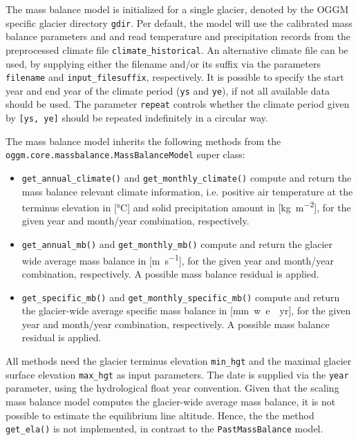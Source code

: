             The mass balance model is initialized for a single glacier, denoted by the OGGM specific glacier directory \lstinline`gdir`. Per default, the model will use the calibrated mass balance parameters \mustar{} and \bias{} and read temperature and precipitation records from the preprocessed climate file \lstinline`climate_historical`. An alternative climate file can be used, by supplying either the filename and/or its suffix via the parameters \lstinline`filename` and \lstinline`input_filesuffix`, respectively. It is possible to specify the start year and end year of the climate period (\lstinline`ys` and \lstinline`ye`), if not all available data should be used. The parameter \lstinline`repeat` controls whether the climate period given by \lstinline`[ys, ye]` should be repeated indefinitely in a circular way.

            The \vas{} mass balance model inherits the following methods from the \lstinline`oggm.core.massbalance.MassBalanceModel` super class:
            \begin{itemize}
                \item \lstinline`get_annual_climate()` and \lstinline`get_monthly_climate()` compute and return the mass balance relevant climate information, i.e. positive air temperature at the terminus elevation in [\si{\celsius}] and solid precipitation amount in [\si{\kg\per\square\m}], for the given year and month/year combination, respectively.
                \item \lstinline`get_annual_mb()` and \lstinline`get_monthly_mb()` compute and return the glacier wide average mass balance in [\si{\m\per\s}], for the given year and month/year combination, respectively. A possible mass balance residual \bias{} is applied.
                \item \lstinline`get_specific_mb()` and \lstinline`get_monthly_specific_mb()` compute and return the glacier-wide average specific mass balance in [\si{mm w.e.\per yr}], for the given year and month/year combination, respectively. A possible mass balance residual \bias{} is applied.
            \end{itemize}
            All methods need the glacier terminus elevation \lstinline`min_hgt` and the maximal glacier surface elevation \lstinline`max_hgt` as input parameters. The date is supplied via the \lstinline`year` parameter, using the hydrological float year convention. Given that the scaling mass balance model computes the glacier-wide average mass balance, it is not possible to estimate the equilibrium line altitude. Hence, the the method \lstinline`get_ela()` is not implemented, in contrast to the \lstinline`PastMassBalance` model.
        
